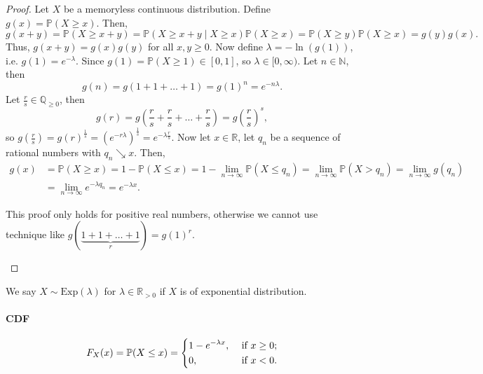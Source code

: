 \begin{proof}
    Let \(X\) be a memoryless continuous distribution. Define \(g(x) = \mathbb{P} (X \ge x)\). Then,
    \[
        g(x + y) = \mathbb{P} (X \ge x+y) = \mathbb{P} (X \ge x+y \mid X \ge x) \mathbb{P} (X \ge x) = \mathbb{P} (X \ge y) \mathbb{P} (X \ge x) = g(y) g(x).
    \]  
    Thus, \(g(x + y) = g(x) g(y)\) for all \(x, y \ge 0\). Now define \(\lambda = - \ln (g(1))\), i.e. \(g(1) = e^{-\lambda}\). Since \(g(1) = \mathbb{P} (X \ge 1) \in [0, 1]\), so \(\lambda \in [0, \infty)\). Let \(n \in \mathbb{N}\), then 
    \[
        g(n) = g(1 + 1 + \dots + 1) = g(1)^n = e^{-n \lambda}.
    \]      
    Let \(\frac{r}{s} \in \mathbb{Q} _{\ge 0}\), then 
    \[
        g(r) = g\left( \frac{r}{s} + \frac{r}{s} + \dots + \frac{r}{s} \right) = g \left( \frac{r}{s} \right)^s,  
    \]
    so \(g\left( \frac{r}{s} \right) = g(r)^{\frac{1}{s}} = (e^{-r \lambda})^{\frac{1}{s}}= e^{-\lambda \frac{r}{s}}\). Now let \(x \in \mathbb{R}\), let \(q_n\) be a sequence of rational numbers with \(q_n \searrow x\). Then,
    \begin{align*}
        g(x) &= \mathbb{P} (X \ge x) = 1 - \mathbb{P} (X \le x) = 1 - \lim_{n \to \infty} \mathbb{P} (X \le q_n) = \lim_{n \to \infty} \mathbb{P} (X > q_n) = \lim_{n \to \infty} g(q_n) \\ &= \lim_{n \to \infty} e^{-\lambda q_n} = e^{-\lambda x}.
    \end{align*}

    \begin{remark}
        This proof only holds for positive real numbers, otherwise we cannot use technique like \(g(\underbrace{1 + 1 + \dots + 1}_{r}) = g(1)^r\). 
    \end{remark}
\end{proof}

\begin{notation}
    We say \(X \sim \mathrm{Exp}(\lambda) \) for \(\lambda \in \mathbb{R} _{> 0}\) if \(X\) is of exponential distribution. 
\end{notation}

\paragraph{CDF}
\[
    F_X(x) = \mathbb{P} (X \le x) = \begin{dcases}
            1 - e^{-\lambda x}, &\text{ if } x \ge 0 ;\\
            0, &\text{ if } x < 0.
        \end{dcases}
\]

